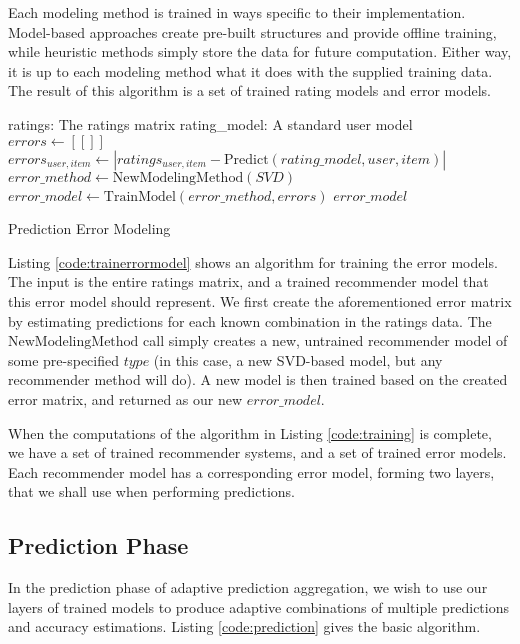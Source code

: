Each modeling method is trained in ways specific to their implementation. 
Model-based approaches create pre-built structures and provide offline training,
while heuristic methods simply store the data for future computation.
Either way, it is up to each modeling method what it does with the supplied training data.
The result of this algorithm is a set of trained rating models and error models.

\begin{algorithm}
  \begin{algorithmic}[1]
  \REQUIRE ratings: The ratings matrix
  \REQUIRE rating\_model: A standard user model
  \ENSURE
    \STATE $errors \gets [[]]$
        \STATE $errors_{user,item} \gets | ratings_{user,item} - \mathrm{Predict}(rating\_model, user, item) |$
    \ENDFOR 
    \STATE $error\_method \gets \mathrm{NewModelingMethod}(SVD)$
    \STATE $error\_model  \gets \mathrm{TrainModel}(error\_method, errors)$
  \RETURN $error\_model$
  \end{algorithmic}
  \caption[Prediction Error Modeling]{Prediction Error Modeling}
  \label{code:trainerrormodel}
\end{algorithm}

Listing \ref{code:trainerrormodel} shows an algorithm for training the error models.
The input is the entire ratings matrix, and a trained recommender model
that this error model should represent.
We first create the aforementioned error matrix by estimating
predictions for each known combination in the ratings data.
The $\mathrm{NewModelingMethod}$ call simply creates a new, untrained
recommender model of some pre-specified $type$
(in this case, a new SVD-based model, but any recommender method will do).
A new model is then trained based on the created error matrix,
and returned as our new $error\_model$.

When the computations of the algorithm in Listing \ref{code:training} is complete,
we have a set of trained recommender systems, and a set of trained error models.
Each recommender model has a corresponding error model,
forming two layers, that we shall use when performing predictions.


\subsection{Prediction Phase}

In the prediction phase of adaptive prediction aggregation,
we wish to use our layers of trained models to produce adaptive
combinations of multiple predictions and accuracy estimations.
Listing \ref{code:prediction} gives the basic algorithm.

